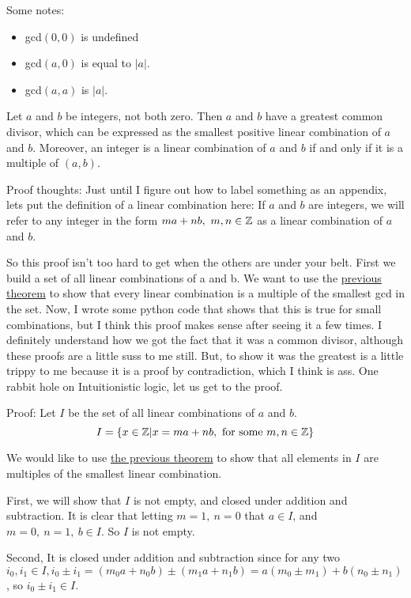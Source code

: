 Some notes:
\begin{itemize}
    \item gcd\((0, 0)\) is undefined
    \item gcd\((a, 0)\) is equal to \(|a|\).
    \item gcd\((a, a)\) is  \(|a|\).
\end{itemize}

 Let \(a\) and \(b\) be integers, not both zero. Then \(a\) and \(b\) have a greatest common divisor, which can be expressed as the smallest positive linear combination of \(a\) and \(b\). Moreover, an integer is a linear combination of \(a\) and \(b\) if and only if it is a multiple of \((a, b)\).

Proof thoughts: Just until I figure out how to label something as an appendix, lets put the definition of a linear combination here:  If \(a\) and \(b\) are integers, we will refer to any integer in the form \(ma + nb,\ m, n \in \mathbb{Z}\) as a linear combination of \(a\) and \(b\).

So this proof isn't too hard to get when the others are under your belt. First we build a set of all linear combinations of a and b. We want to use the \hyperref[def:1.1.4]{previous theorem} to show that every linear combination is a multiple of the smallest gcd in the set. Now, I wrote some python code that shows that this is true for small combinations, but I think this proof makes sense after seeing it a few times. I definitely understand how we got the fact that it was a common divisor, although these proofs are a little suss to me still. But, to show it was the greatest is a little trippy to me because it is a proof by contradiction, which I think is ass. One rabbit hole on Intuitionistic logic, let us get to the proof.

Proof: Let \(I\) be the set of all linear combinations of \(a\) and \(b\).
\[I = \{x \in \mathbb{Z} | x = ma + nb, \text{ for some } m,n \in \mathbb{Z}\}\]

We would like to use \hyperref[def:1.1.4]{the previous theorem} to show that all elements in \(I\) are multiples of the smallest linear combination.

First, we will show that \(I\) is not empty, and closed under addition and subtraction. It is clear that letting \(m = 1,\ n = 0\) that \(a \in I\), and \(m = 0,\ n = 1,\ b \in I\). So \(I\) is not empty.

Second, It is closed under addition and subtraction since for any two \(i_0, i_1 \in I, i_0 \pm i_1 = (m_0a + n_0b) \pm (m_1a + n_1b) = a(m_0 \pm m_1) + b(n_0 \pm n_1)\), so \(i_0 \pm i_1 \in I\).

